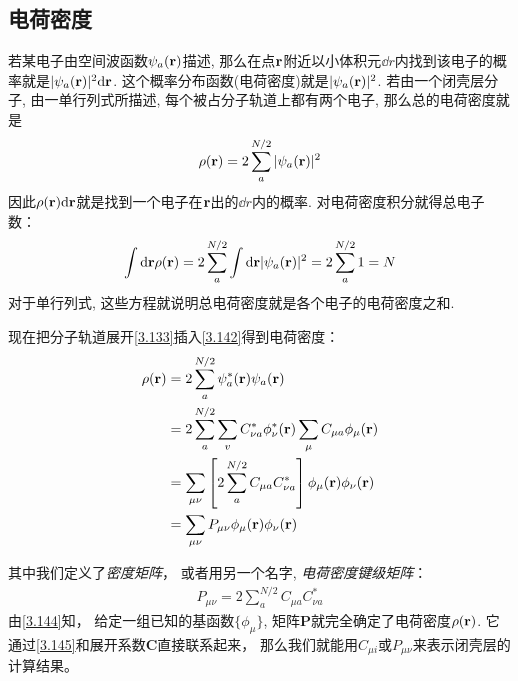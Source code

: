 \subsection{电荷密度}
若某电子由空间波函数$\psi_a(\mathbf{r})$描述, 
那么在点$\mathbf{r}$附近以小体积元$\dd{r}$内找到该电子的概率就是$|\psi_a(\bfr)|^2\dd{r}$. 
这个概率分布函数(电荷密度)就是$|\psi_a(\mathbf{r})|^2$. 
若由一个闭壳层分子, 
由一单行列式所描述, 
每个被占分子轨道上都有两个电子, 
那么总的电荷密度就是
\begin{align}
	\label{3.142}
	\rho(\mathbf{r}) = 2 \sum_{a}^{N/2} |\psi_a(\mathbf{r})|^2
\end{align}
因此$\rho(\bfr)\dd{r}$就是找到一个电子在$\mathbf{r}$出的$\dd{r}$内的概率. 
对电荷密度积分就得总电子数：
\begin{align}
	\int\dd{r}\rho(\bfr) = 2 \sum_{a}^{N/2} \int\dd{r}|\psi_a(\bfr)|^2 = 2\sum_{a}^{N/2}1=N
\end{align}
对于单行列式, 
这些方程就说明总电荷密度就是各个电子的电荷密度之和.


现在把分子轨道展开\autoref{3.133}插入\autoref{3.142}得到电荷密度：
\begin{align}
	\rho(\mathbf{r}) & = 2\sum_{a}^{N/2}\psi_a^*(\mathbf{r})\psi_a(\mathbf{r}) \notag\\
	& = 2\sum_{a}^{N/2}\sum_{v} C_{\nu a}^*\phi_\nu^*(\mathbf{r})\sum_{\mu}C_{\mu a}\phi_\mu(\mathbf{r}) \notag\\
	& = \sum_{\mu\nu}\left[ 2\sum_{a}^{N/2}C_{\mu a}C_{\nu a}^* \right]\phi_\mu(\mathbf{r})\phi_\nu(\mathbf{r}) \notag\\
	& = \sum_{\mu\nu}P_{\mu\nu} \phi_\mu(\mathbf{r})\phi_\nu(\mathbf{r})
	\label{3.144}
\end{align}

其中我们定义了\emph{密度矩阵}，
或者用另一个名字, 
\emph{电荷密度键级矩阵}：
\begin{align}
	P_{\mu\nu} = 2\sum_{a}^{N/2}C_{\mu a}C_{\nu a}^*
	\label{3.145}
\end{align}
由\autoref{3.144}知，
给定一组已知的基函数$\{\phi_\mu\}$, 
矩阵$\mathbf{P}$就完全确定了电荷密度$\rho(\mathbf{r})$. 
它通过\autoref{3.145}和展开系数$\mathbf{C}$直接联系起来，
那么我们就能用$C_{\mu i}$或$P_{\mu\nu}$来表示闭壳层\hft 的计算结果。


